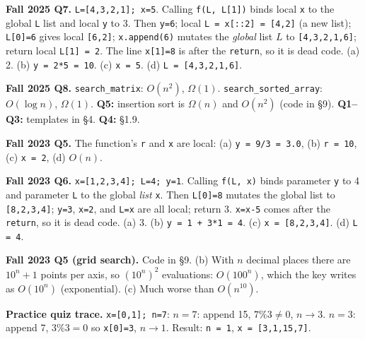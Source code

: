 \documentclass[10pt]{article}
\newcommand{\code}[1]{\lstinline[basicstyle=\ttfamily\small]{#1}}
\begin{document}
\textbf{Fall 2025 Q7.} \code{L=[4,3,2,1]; x=5}. Calling \code{f(L, L[1])} binds local \code{x} to the global \code{L} list and local \code{y} to 3. Then \code{y=6}; local \code{L = x[::2] = [4,2]} (a new list); \code{L[0]=6} gives local \code{[6,2]}; \code{x.append(6)} mutates the \emph{global} list $L$ to \code{[4,3,2,1,6]}; return local \code{L[1] = 2}. The line \code{x[1]=8} is after the \code{return}, so it is dead code.
(a) 2. (b) \code{y = 2*5 = 10}. (c) \code{x = 5}. (d) \code{L = [4,3,2,1,6]}.

\textbf{Fall 2025 Q8.} \code{search_matrix}: $O(n^2)$, $\Omega(1)$. \code{search_sorted_array}: $O(\log n)$, $\Omega(1)$.
\textbf{Q5:} insertion sort is $\Omega(n)$ and $O(n^2)$ (code in \S9). \textbf{Q1--Q3:} templates in \S4. \textbf{Q4:} \S1.9.

\textbf{Fall 2023 Q5.} The function's \code{r} and \code{x} are local: (a) \code{y = 9/3 = 3.0}, (b) \code{r = 10}, (c) \code{x = 2}, (d) $O(n)$.

\textbf{Fall 2023 Q6.} \code{x=[1,2,3,4]; L=4; y=1}. Calling \code{f(L, x)} binds parameter \code{y} to 4 and parameter \code{L} to the global \emph{list} \code{x}. Then \code{L[0]=8} mutates the global list to \code{[8,2,3,4]}; \code{y=3}, \code{x=2}, and \code{L=x} are all local; return 3. \code{x=x-5} comes after the \code{return}, so it is dead code.
(a) 3. (b) \code{y = 1 + 3*1 = 4}. (c) \code{x = [8,2,3,4]}. (d) \code{L = 4}.

\textbf{Fall 2023 Q5 (grid search).} Code in \S9. (b) With $n$ decimal places there are $10^n+1$ points per axis, so $(10^n)^2$ evaluations: $O(100^n)$, which the key writes as $O(10^n)$ (exponential). (c) Much worse than $O(n^{10})$.

\textbf{Practice quiz trace.} \code{x=[0,1]; n=7}: $n=7$: append 15, $7\%3\ne0$, $n\to3$. $n=3$: append 7, $3\%3=0$ so \code{x[0]=3}, $n\to1$. Result: \code{n = 1}, \code{x = [3,1,15,7]}.

\end{document}
